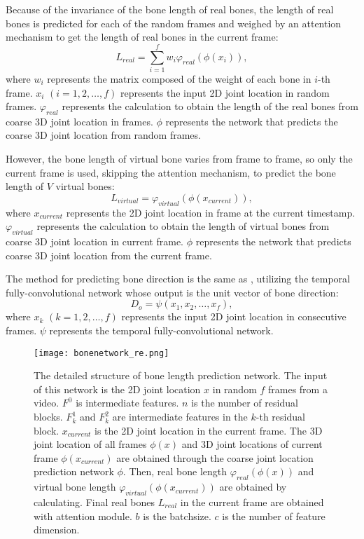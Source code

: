 \documentclass[journal]{IEEEtran}
\begin{document}
Because of the invariance of the bone length of real bones, the length of real bones is predicted for each of the random frames and weighed by an attention mechanism to get the length of real bones in the current frame:
\begin{equation}
	L_{real} = \sum_{i=1}^{f} w_i \varphi_{real}(\phi(x_i)),
\end{equation}
where $w_i$ represents the matrix composed of the weight of each bone in $i$-th frame. $x_i$  $(i=1, 2,\dots,f)$ represents the input 2D joint location in random frames. $\varphi_{real}$ represents the calculation to obtain the length of the real bones from coarse 3D joint location in frames. $\phi$ represents the network that predicts the coarse 3D joint location from random frames.

However, the bone length of virtual bone varies from frame to frame, so only the current frame is used, skipping the attention mechanism, {to predict the bone length of $V$ virtual bones}:
\begin{equation}
	L_{virtual} = \varphi_{virtual}(\phi(x_{current})),
\end{equation}
where $x_{current}$ represents the 2D joint location in frame at the current timestamp. $\varphi_{virtual}$ represents the calculation to obtain the length of virtual bones from coarse 3D joint location in current frame. $\phi$ represents the network that predicts coarse 3D joint location from the current frame.


The method for predicting bone direction is the same as \cite{20183D}, utilizing the temporal fully-convolutional network whose output is the unit vector of bone direction:
\begin{equation}
	D_{o}=\psi(x_1, x_2, \dots, x_f),
\end{equation}
where $x_k$  $(k=1, 2,\dots,f)$ represents the input 2D joint location in consecutive frames. $\psi$ represents the temporal fully-convolutional network.

\begin{figure*}[t]
	\centering
	\texttt{[image: bonenetwork\_re.png]}
	\vspace{-3pt}
	\caption{The detailed structure of bone length prediction network.  {The input of this network is the 2D joint location $x$ in random $f$ frames from a video. $F^0$ is intermediate features. $n$ is the number of residual blocks. $F_{k}^1$ and $F_{k}^2$ are intermediate features in the $k$-th residual block. $x_{current}$ is the 2D joint location in the current frame. The 3D joint location of all frames $\phi(x)$ and 3D joint locations of current frame $\phi(x_{current})$ are obtained through the coarse joint location prediction network $\phi$. Then, real bone length $\varphi_{real}(\phi(x))$ and virtual bone length $\varphi_{virtual}(\phi(x_{current}))$ are obtained by calculating. Final real bones $L_{real}$ in the current frame are obtained with attention module. $b$ is the batchsize. $c$ is the number of feature dimension.}}

	\label{fig:3}
	\vspace{-0pt}
\end{figure*}
\end{document}
